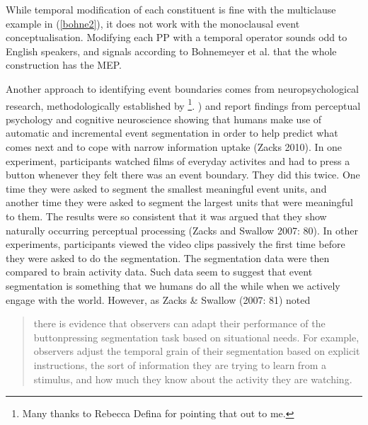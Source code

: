 While temporal modification of each constituent is fine with the multiclause example in (\ref{bohne2}), it does not work with the monoclausal event conceptualisation. Modifying each PP with a temporal operator sounds odd to English speakers, and signals according to Bohnemeyer et al. that the whole construction has the MEP.

Another approach to identifying event boundaries comes from neuropsychological research, methodologically established by \textcite{newtson1976perceptual}\footnote{Many thanks to Rebecca Defina for pointing that out to me.}. \textcite{zacks2007event}) and \textcite{zacks2010we} report findings from perceptual psychology and cognitive neuroscience showing that humans make use of automatic and incremental event segmentation in order to help predict what comes next and to cope with narrow information uptake (Zacks 2010). In one experiment, participants watched films of everyday activites and had to press a button whenever they felt there was an event boundary. They did this twice. One time they were asked to segment the smallest meaningful event units, and another time they were asked to segment the largest units that were meaningful to them. The results were so consistent that it was argued that they show naturally occurring perceptual processing (Zacks and Swallow 2007: 80). In other experiments, participants viewed the video clips passively the first time before they were asked to do the segmentation. The segmentation data were then compared to brain activity data. Such data seem to suggest that event segmentation is something that we humans do all the while when we actively engage with the world. However, as Zacks \& Swallow (2007: 81) noted 

\begin{quote}there is evidence
that observers can adapt their performance of the buttonpressing
segmentation task based on situational needs. For
example, observers adjust the temporal grain of their segmentation
based on explicit instructions, the sort of information they
are trying to learn from a stimulus, and how much they know
about the activity they are watching.\end{quote}

